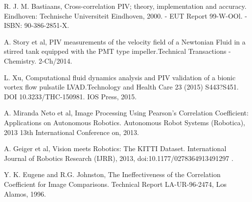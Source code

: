 \documentclass[letterpaper, 10 pt,conference]{ieeeconf}  %
\begin{document}
\begin{thebibliography}{99}
	 R. J. M. Bastiaans, Cross-correlation PIV; theory, implementation and accuracy. 
        Eindhoven: Technische Universiteit Eindhoven, 2000. - EUT Report 99-W-OOl. - ISBN: 90-386-2851-X.

	 A. Story et al, PIV measurements of the velocity field of a Newtonian Fluid in a stirred tank equipped 
	with the PMT type impeller.Technical Transactions - Chemistry. 2-Ch/2014.        

	 L. Xu, Computational fluid dynamics analysis and PIV validation of a bionic vortex flow 
	pulsatile LVAD.Technology and Health Care 23 (2015) S443?S451. DOI 10.3233/THC-150981. IOS Press, 2015.
	
         A. Miranda Neto et al, Image Processing Using Pearson's Correlation Coefficient: 
        Applications on Autonomous Robotics. 
        Autonomous Robot Systems (Robotica), 2013 13th International Conference on, 2013.
        
         A. Geiger et al,
        Vision meets Robotics: The KITTI Dataset. International Journal of Robotics Research (IJRR), 2013, 
        doi:10.1177/0278364913491297 .
        
         Y. K. Eugene and R.G. Johnston, The Ineffectiveness of the Correlation Coefficient for Image Comparisons.
        Technical Report LA-UR-96-2474, Los Alamos, 1996.
        
        
	

\end{thebibliography}
\end{document}
